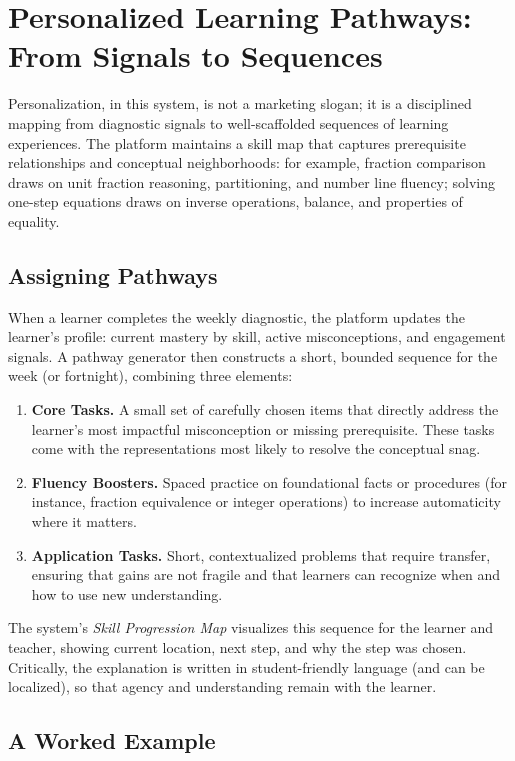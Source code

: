 \section{Personalized Learning Pathways: From Signals to Sequences}

Personalization, in this system, is not a marketing slogan; it is a disciplined mapping from diagnostic signals to well-scaffolded sequences of learning experiences. The platform maintains a skill map that captures prerequisite relationships and conceptual neighborhoods: for example, fraction comparison draws on unit fraction reasoning, partitioning, and number line fluency; solving one-step equations draws on inverse operations, balance, and properties of equality.

\subsection{Assigning Pathways}

When a learner completes the weekly diagnostic, the platform updates the learner's profile: current mastery by skill, active misconceptions, and engagement signals. A pathway generator then constructs a short, bounded sequence for the week (or fortnight), combining three elements:

\begin{enumerate}
  \item \textbf{Core Tasks.} A small set of carefully chosen items that directly address the learner's most impactful misconception or missing prerequisite. These tasks come with the representations most likely to resolve the conceptual snag.
  \item \textbf{Fluency Boosters.} Spaced practice on foundational facts or procedures (for instance, fraction equivalence or integer operations) to increase automaticity where it matters.
  \item \textbf{Application Tasks.} Short, contextualized problems that require transfer, ensuring that gains are not fragile and that learners can recognize when and how to use new understanding.
\end{enumerate}

The system's \emph{Skill Progression Map} visualizes this sequence for the learner and teacher, showing current location, next step, and why the step was chosen. Critically, the explanation is written in student-friendly language (and can be localized), so that agency and understanding remain with the learner.

\subsection{A Worked Example}

